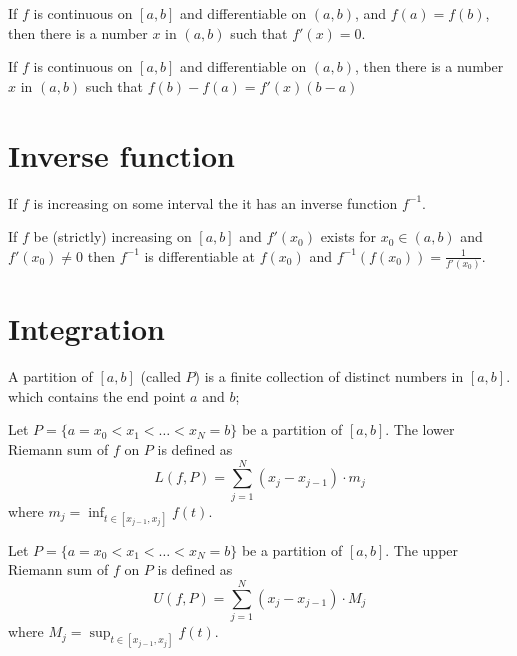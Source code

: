 \begin{theorem*}
  If $f$ is continuous on $[a,b]$ and differentiable on $(a, b)$, and $f(a) = f(b)$, then
  there is a number $x$ in $(a, b)$ such that $f'(x) = 0$.
\end{theorem*}

\begin{theorem*}
  If $f$ is continuous on $[a,b]$ and differentiable on $(a, b)$, then there is a number $x$ in $(a, b)$ such that
    $f(b) - f(a) = f'(x)(b-a)$
\end{theorem*}

\section{Inverse function}

\begin{theorem*}
  If $f$ is increasing on some interval the it has an inverse function $f^{-1}$.
\end{theorem*}

\begin{theorem*}
  If $f$ be (strictly) increasing on $[a, b]$ and $f'(x_0)$ exists for $x_0 \in (a, b)$ and $f'(x_0) \neq 0$ then 
  $f^{-1}$ is differentiable at $f(x_0)$ and $f^{-1}(f(x_0)) = \frac{1}{f'(x_0)}$. 
\end{theorem*}

\section{Integration}
\begin{definition*}[Partition]
  A partition of $[a, b]$ (called $P$) is a finite collection of distinct numbers in $[a, b]$. 
  which contains the end point $a$ and $b$;
\end{definition*}

\begin{definition*}
  Let $P = \{a = x_0 < x_1 < \dotsc < x_N = b \}$ be a partition of $[a, b]$.
  The lower Riemann sum of $f$ on $P$ is defined as
  \[ L(f, P) = \sum_{j=1}^N (x_j - x_{j-1}) \cdot m_j \]
  where $\displaystyle m_j = \inf_{t \in {[x_{j-1}, x_j]}} f(t)$.
\end{definition*}

\begin{definition*}
  Let $P = \{a = x_0 < x_1 < \dotsc < x_N = b \}$ be a partition of $[a, b]$.
  The upper Riemann sum of $f$ on $P$ is defined as
  \[ U(f, P) = \sum_{j=1}^N (x_j - x_{j-1}) \cdot M_j \]
  where $\displaystyle M_j = \sup_{t \in {[x_{j-1}, x_j]}} f(t)$.
\end{definition*}

